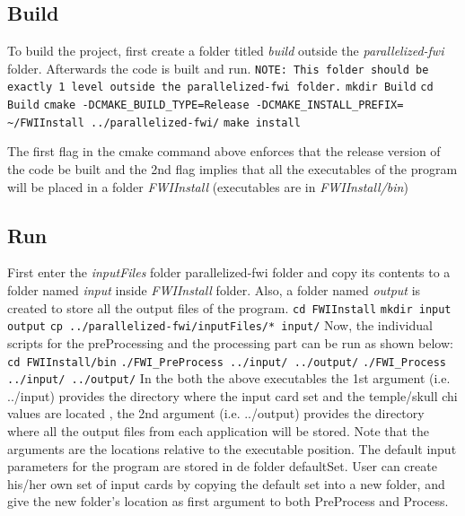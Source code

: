 \documentclass[10pt]{article}
\begin{document}
\subsection{Build}
To build the project, first create a folder titled \textit{build} outside the \textit{parallelized-fwi} folder. Afterwards the code is built and run. 
\newline
\texttt{NOTE: This folder should be exactly 1 level outside the parallelized-fwi folder.}
\newline
\texttt{mkdir Build}
\newline
\texttt{cd Build}
\newline
\texttt{cmake -DCMAKE\_BUILD\_TYPE=Release -DCMAKE\_INSTALL\_PREFIX= \textasciitilde/FWIInstall ../parallelized-fwi/}
\newline
\texttt{make install} 
\newline

\noindent The first flag in the cmake command above enforces that the release version of the code be built and the 2nd flag implies that all the executables of the program will be placed in a folder \textit{FWIInstall} (executables are in \textit{FWIInstall/bin})

\subsection{Run}
First enter the \textit{inputFiles} folder parallelized-fwi folder and copy its contents to a folder named \textit{input} inside \textit{FWIInstall} folder. Also, a folder named \textit{output} is created to store all the output files of the program.
\newline
\texttt{cd FWIInstall}
\newline
\texttt{mkdir input output}
\newline
\texttt{cp ../parallelized-fwi/inputFiles/* input/} 
\newline
Now, the individual scripts for the preProcessing and the processing part can be run as shown below:
\newline
\texttt{cd FWIInstall/bin}
\newline
\texttt{./FWI\_PreProcess ../input/ ../output/}
\newline
\texttt{./FWI\_Process ../input/ ../output/}
\newline
\noindent In the both the above executables the 1st argument (i.e. ../input) provides the directory where the input card set and the temple/skull chi values are located , the 2nd argument (i.e. ../output) provides the directory where all the output files from each application will be stored. Note that the arguments are the locations relative to the executable position. The default input parameters for the program are stored in de folder defaultSet. User can create his/her own set of input cards by copying the default set into a new folder, and give the new folder's location as first argument to both PreProcess and Process.
\end{document}
